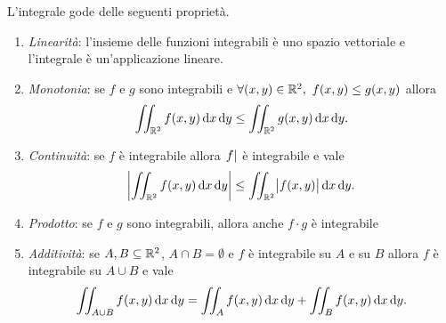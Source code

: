 \begin{prop}
	L'integrale gode delle seguenti proprietà.
	\begin{enumerate}[label = (\arabic*)]
		\item \emph{Linearità}: l'insieme delle funzioni integrabili è uno spazio vettoriale e l'integrale è un'applicazione lineare.
		\item \emph{Monotonia}: se $ f $ e $ g $ sono integrabili e $ \forall (x, y) \in \R^2, \ f(x, y) \leq g(x, y) $ allora 
		\[
			\iint_{\R^2} f(x, y) \dif{x}\dif{y} \leq \iint_{\R^2} g(x, y) \dif{x}\dif{y}.
		\]
		\item \emph{Continuità}: se $ f $ è integrabile allora $ \abs{f} $ è integrabile e vale 
		\[
			\abs{\iint_{\R^2} f(x, y) \dif{x}\dif{y}} \leq \iint_{\R^2} \abs{f(x, y)} \dif{x}\dif{y}.
		\]
		\item \emph{Prodotto}: se $ f $ e $ g $ sono integrabili, allora anche $ f \cdot g $ è integrabile 
		\item \emph{Additività}: se $ A, B \subseteq \mathbb{R}^2 $, $ A \cap B = \emptyset $ e $ f $ è integrabile su $ A $ e su $ B $ allora $ f $ è integrabile su $ A \cup B $ e vale 
		\[
			\iint_{A \cup B} f(x, y) \dif{x}\dif{y} = \iint_{A} f(x, y) \dif{x}\dif{y} + \iint_{B} f(x, y) \dif{x}\dif{y}.
		\]
	\end{enumerate}
\end{prop}

